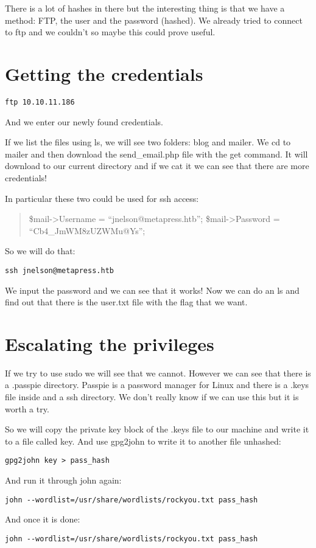 \documentclass[11pt]{article}
\begin{document}
There is a lot of hashes in there but the interesting thing is that we have a method:
FTP, the user and the password (hashed). We already tried to connect to ftp and we
couldn't so maybe this could prove useful.

\section{Getting the credentials}
\label{sec:org8ab4290}

\begin{verbatim}
ftp 10.10.11.186
\end{verbatim}
And we enter our newly found credentials.

If we list the files using ls, we will see two folders: blog and mailer.
We cd to mailer and then download the send\_email.php file with the get command.
It will download to our current directory and if we cat it we can see that there are
more credentials!

In particular these two could be used for ssh access:
\begin{quote}
\$mail->Username = ``jnelson@metapress.htb'';
\$mail->Password = ``Cb4\_JmWM8zUZWMu@Ys'';
\end{quote}

So we will do that:
\begin{verbatim}
ssh jnelson@metapress.htb
\end{verbatim}
We input the password and we can see that it works!
Now we can do an ls and find out that there is the user.txt file with the flag that
we want.

\section{Escalating the privileges}
\label{sec:org7239e44}

If we try to use sudo we will see that we cannot. However we can see that there is a
.passpie directory. Passpie is a password manager for Linux and there is a .keys
file inside and a ssh directory. We don't really know if we can use this but it is
worth a try.

So we will copy the private key block of the .keys file to our machine and write it
to a file called key. And use gpg2john to write it to another file unhashed:

\begin{verbatim}
gpg2john key > pass_hash
\end{verbatim}

And run it through john again:
\begin{verbatim}
john --wordlist=/usr/share/wordlists/rockyou.txt pass_hash
\end{verbatim}
And once it is done:
\begin{verbatim}
john --wordlist=/usr/share/wordlists/rockyou.txt pass_hash
\end{verbatim}
\end{document}
